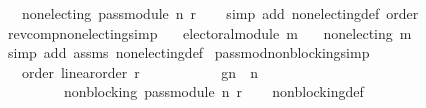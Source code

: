 \begin{isabellebody}
\ \ \ {\isachardoublequoteopen}non{\isacharunderscore}{\kern0pt}electing\ {\isacharparenleft}{\kern0pt}pass{\isacharunderscore}{\kern0pt}module\ n\ r{\isacharparenright}{\kern0pt}{\isachardoublequoteclose}\isanewline
%
\isadelimproof
\ \ %
\endisadelimproof
%
\isatagproof
{}\isamarkupfalse%
\ {\isacharparenleft}{\kern0pt}simp\ add{\isacharcolon}{\kern0pt}\ non{\isacharunderscore}{\kern0pt}electing{\isacharunderscore}{\kern0pt}def\ order{\isacharparenright}{\kern0pt}%
\endisatagproof
{\isafoldproof}%
%
\isadelimproof
\isanewline
%
\endisadelimproof
\isanewline
\isanewline
{}\isamarkupfalse%
\ rev{\isacharunderscore}{\kern0pt}comp{\isacharunderscore}{\kern0pt}non{\isacharunderscore}{\kern0pt}electing{\isacharbrackleft}{\kern0pt}simp{\isacharbrackright}{\kern0pt}{\isacharcolon}{\kern0pt}\isanewline
\ \ \ {\isachardoublequoteopen}electoral{\isacharunderscore}{\kern0pt}module\ m{\isachardoublequoteclose}\isanewline
\ \ \ {\isachardoublequoteopen}non{\isacharunderscore}{\kern0pt}electing\ {\isacharparenleft}{\kern0pt}m{\isasymdown}{\isacharparenright}{\kern0pt}{\isachardoublequoteclose}\isanewline
%
\isadelimproof
\ \ %
\endisadelimproof
%
\isatagproof
{}\isamarkupfalse%
\ {\isacharparenleft}{\kern0pt}simp\ add{\isacharcolon}{\kern0pt}\ assms\ non{\isacharunderscore}{\kern0pt}electing{\isacharunderscore}{\kern0pt}def{\isacharparenright}{\kern0pt}%
\endisatagproof
{\isafoldproof}%
%
\isadelimproof
\isanewline
%
\endisadelimproof
\isanewline
\isanewline
{}\isamarkupfalse%
\ pass{\isacharunderscore}{\kern0pt}mod{\isacharunderscore}{\kern0pt}non{\isacharunderscore}{\kern0pt}blocking{\isacharbrackleft}{\kern0pt}simp{\isacharbrackright}{\kern0pt}{\isacharcolon}{\kern0pt}\isanewline
\ \ \ order{\isacharcolon}{\kern0pt}\ {\isachardoublequoteopen}linear{\isacharunderscore}{\kern0pt}order\ r{\isachardoublequoteclose}\ \isanewline
\ \ \ \ \ \ \ \ \ \ g{}{\isacharunderscore}{\kern0pt}n{\isacharcolon}{\kern0pt}\ \ {\isachardoublequoteopen}n\ {\isachargreater}{\kern0pt}\ {}{\isachardoublequoteclose}\isanewline
\ \ \ \ \ \ \ \ \ {\isachardoublequoteopen}non{\isacharunderscore}{\kern0pt}blocking\ {\isacharparenleft}{\kern0pt}pass{\isacharunderscore}{\kern0pt}module\ n\ r{\isacharparenright}{\kern0pt}{\isachardoublequoteclose}\isanewline
%
\isadelimproof
\ \ %
\endisadelimproof
%
\isatagproof
{}\isamarkupfalse%
\ non{\isacharunderscore}{\kern0pt}blocking{\isacharunderscore}{\kern0pt}def\isanewline

\end{isabellebody}
